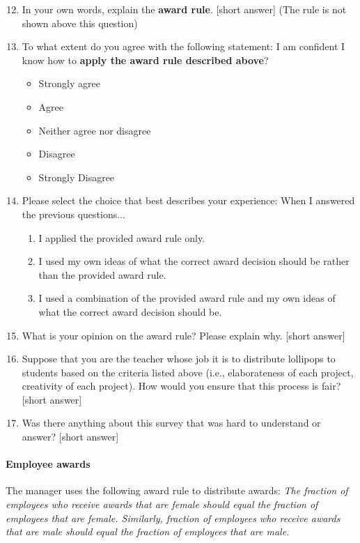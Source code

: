 \documentclass{article}
\begin{document}
\begin{enumerate}
    \setcounter{enumi}{11}
    \item In your own words, explain the \textbf{award rule}. [short answer] (The rule is not shown above this question)
    \item To what extent do you agree with the following statement: I am confident I know how to \textbf{apply the award rule described above}?
    \begin{itemize}
        \item Strongly agree
        \item Agree
        \item Neither agree nor disagree
        \item Disagree
        \item Strongly Disagree
    \end{itemize}
    \item Please select the choice that best describes your experience: When I answered the previous questions...
    \begin{enumerate}
        \item I applied the provided award rule only.
        \item I used my own ideas of what the correct award decision should be rather than the provided award rule.
        \item I used a combination of the provided award rule and my own ideas of what the correct award decision should be.
    \end{enumerate}
    \item What is your opinion on the award rule? Please explain why. [short answer]
    \item Suppose that you are the teacher whose job it is to distribute lollipops to students based on the criteria listed above (i.e., elaborateness of each project, creativity of each project). How would you ensure that this process is fair? [short answer]
    \item Was there anything about this survey that was hard to understand or answer? [short answer]
\end{enumerate}

\paragraph{Employee awards}
The manager uses the following award rule to distribute awards: \emph{The fraction of employees who receive awards that are female should equal the fraction of employees that are female. Similarly, fraction of employees who receive awards that are male should equal the fraction of employees that are male.}
\end{document}
